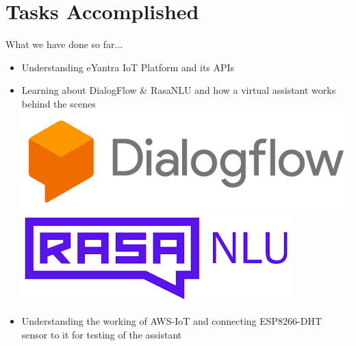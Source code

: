\documentclass[10pt, a4paper]{beamer}
\begin{document}
\section{Tasks Accomplished}
\begin{frame}{What we have done so far...}
	\begin{itemize}
		\item Understanding eYantra IoT Platform and its APIs
		\newline
		\item Learning about DialogFlow \& RasaNLU and how a virtual assistant works behind the scenes
		\newline\\\vspace{0.5cm}
		\hspace{1cm}
		\includegraphics[totalheight=.8cm]{dialogflow.png}\hspace{1cm}
		\includegraphics[totalheight=.7cm]{rasa.png}
		\newline
		\item Understanding the working of AWS-IoT and connecting ESP8266-DHT sensor to it for testing of the assistant
	\end{itemize}
\end{frame}
\end{document}
